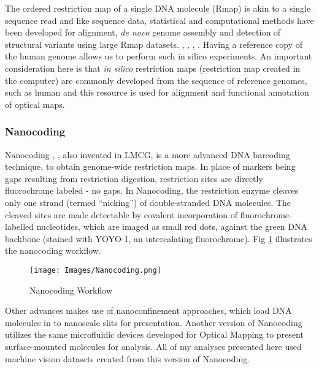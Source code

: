 The ordered restriction map of a single DNA molecule (Rmap) is akin to a single sequence read and like sequence data, statistical and computational methods have been developed for alignment, {\emph{de novo}} genome assembly and detection of structural variants using large Rmap datasets. \cite{Valouev_etal_2006_JCB}, \cite{Valouev_etal_2006_PNAS}, \cite{Valouev_etal_2006_BioInfo}, \cite{Sarkar_etal_2012_JCB}. Having a reference copy of the human genome allows us to perform such in silico experiments. An important consideration here is that {\emph{in silico}} restriction maps (restriction map created in the computer) are commonly developed from the sequence of reference genomes, such as human and this resource is used for alignment and functional annotation of optical maps.

\subsubsection*{Nanocoding}
Nanocoding \cite{Jo_etal_2007_PNAS}, \cite{Jo_etal_2009}, also invented in LMCG, is a more advanced DNA barcoding technique, to obtain genome-wide restriction maps. In place of markers being gaps resulting from restriction digestion, restriction sites are directly fluorochrome labeled - no gaps. In Nanocoding, the restriction enzyme cleaves only one strand (termed ``nicking'') of double-stranded DNA molecules. The cleaved sites are made detectable by covalent incorporation of fluorochrome-labelled nucleotides, which are imaged as small red dots, against the green DNA backbone (stained with YOYO-1, an intercalating fluorochrome). Fig \ref{fig:Nanocoding} illustrates the nanocoding workflow. 

\begin{figure}[H]
\begin{center}
\texttt{[image: Images/Nanocoding.png]}
\end{center}
\caption{Nanocoding Workflow}
\label{fig:Nanocoding}
\end{figure}

Other advances makes use of nanoconfinement approaches, which load DNA molecules in to nanoscale slits for presentation. Another version of Nanocoding utilizes the same microfluidic devices developed
for Optical Mapping to present surface-mounted molecules for analysis. All of my analyses presented here used machine vision datasets created from this version of Nanocoding.

